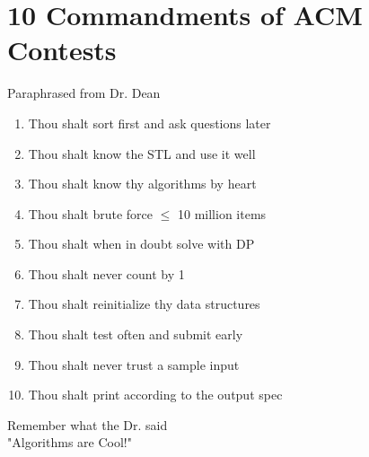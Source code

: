 \begingroup
\let\clearpage\relax
\chapter*{10 Commandments of ACM Contests}
\begin{center}Paraphrased from Dr. Dean\end{center}
\begin{multicols}{2}
\begin{enumerate}
    \item Thou shalt sort first and ask questions later
    \item Thou shalt know the STL and use it well
    \item Thou shalt know thy algorithms by heart
    \item Thou shalt brute force $\leq$ 10 million items
    \item Thou shalt when in doubt solve with DP
    \item Thou shalt never count by 1
    \item Thou shalt reinitialize thy data structures
    \item Thou shalt test often and submit early
    \item Thou shalt never trust a sample input
    \item Thou shalt print according to the output spec
\end{enumerate}
\end{multicols}
\begin{center}
Remember what the Dr. said\\
"Algorithms are Cool!"
\end{center}

\endgroup
